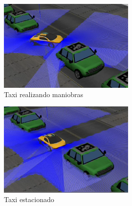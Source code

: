 \begin{figure}[H]
  \begin{center}
    \includegraphics[width=0.6\textwidth]{figures/Autopark/Experimento2_3.png}
		\caption{Taxi realizando maniobras}
		\label{fig.Experimento2_3}
		\end{center}
\end{figure}

\begin{figure}[H]
  \begin{center}
    \includegraphics[width=0.6\textwidth]{figures/Autopark/Experimento2_4.png}
		\caption{Taxi estacionado}
		\label{fig.Experimento2_4}
		\end{center}
\end{figure}